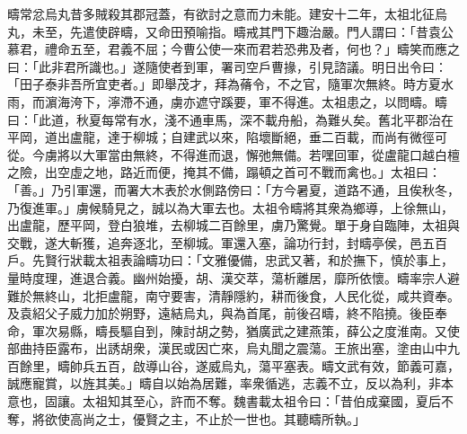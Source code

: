 \begin{pinyinscope}
疇常忿烏丸昔多賊殺其郡冠蓋，有欲討之意而力未能。建安十二年，太祖北征烏丸，未至，先遣使辟疇，又命田預喻指。疇戒其門下趣治嚴。門人謂曰：「昔袁公慕君，禮命五至，君義不屈；今曹公使一來而君若恐弗及者，何也？」疇笑而應之曰：「此非君所識也。」遂隨使者到軍，署司空戶曹掾，引見諮議。明日出令曰：「田子泰非吾所宜吏者。」即舉茂才，拜為蓨令，不之官，隨軍次無終。時方夏水雨，而濵海洿下，濘滯不通，虜亦遮守蹊要，軍不得進。太祖患之，以問疇。疇曰：「此道，秋夏每常有水，淺不通車馬，深不載舟船，為難乆矣。舊北平郡治在平岡，道出盧龍，達于柳城；自建武以來，陷壞斷絕，垂二百載，而尚有微徑可從。今虜將以大軍當由無終，不得進而退，懈弛無備。若嘿回軍，從盧龍口越白檀之險，出空虛之地，路近而便，掩其不備，蹋頓之首可不戰而禽也。」太祖曰：「善。」乃引軍還，而署大木表於水側路傍曰：「方今暑夏，道路不通，且俟秋冬，乃復進軍。」虜候騎見之，誠以為大軍去也。太祖令疇將其衆為鄉導，上徐無山，出盧龍，歷平岡，登白狼堆，去柳城二百餘里，虜乃驚覺。單于身自臨陣，太祖與交戰，遂大斬獲，追奔逐北，至柳城。軍還入塞，論功行封，封疇亭侯，邑五百戶。先賢行狀載太祖表論疇功曰：「文雅優備，忠武又著，和於撫下，慎於事上，量時度理，進退合義。幽州始擾，胡、漢交萃，蕩析離居，靡所依懷。疇率宗人避難於無終山，北拒盧龍，南守要害，清靜隱約，耕而後食，人民化從，咸共資奉。及袁紹父子威力加於朔野，遠結烏丸，與為首尾，前後召疇，終不陷撓。後臣奉命，軍次易縣，疇長驅自到，陳討胡之勢，猶廣武之建燕策，薛公之度淮南。又使部曲持臣露布，出誘胡衆，漢民或因亡來，烏丸聞之震蕩。王旅出塞，塗由山中九百餘里，疇帥兵五百，啟導山谷，遂威烏丸，蕩平塞表。疇文武有效，節義可嘉，誠應寵賞，以旌其美。」疇自以始為居難，率衆循逃，志義不立，反以為利，非本意也，固讓。太祖知其至心，許而不奪。魏書載太祖令曰：「昔伯成棄國，夏后不奪，將欲使高尚之士，優賢之主，不止於一世也。其聽疇所執。」


\end{pinyinscope}

